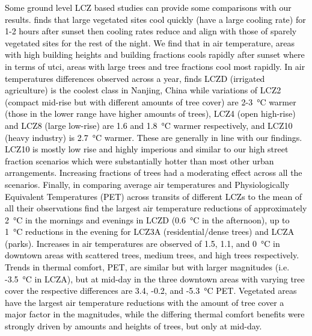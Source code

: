 \documentclass[final,3p,times,authoryear]{elsarticle}
\newcommand{\add}[1]{\textcolor{black}{#1}}
\begin{document}
\add{Some ground level LCZ based studies can provide some comparisons with our results. \cite{Holmer2013} finds that large vegetated sites cool quickly (have a large cooling rate) for 1-2 hours after sunset then cooling rates reduce and align with those of sparely vegetated sites for the rest of the night. We find that in air temperature, areas with high building heights and building fractions cools rapidly after sunset where in terms of \gls{utci}, areas with large trees and tree fractions cool most rapidly. In air temperatures differences observed across a year, \cite{Yang2018} finds LCZD (irrigated agriculture) is the coolest class in Nanjing, China while variations of LCZ2 (compact mid-rise but with different amounts of tree cover) are 2-3\SI{}{\degreeCelsius} warmer (those in the lower range have higher amounts of trees), LCZ4 (open high-rise) and LCZ8 (large low-rise) are 1.6 and 1.8\SI{}{\degreeCelsius} warmer respectively, and LCZ10 (heavy industry) is 2.7\SI{}{\degreeCelsius} warmer. These are generally in line with our findings. LCZ10 is mostly low rise and highly imperious and similar to our high street fraction scenarios which were substantially hotter than most other urban arrangements. Increasing fractions of trees had a moderating effect across all the scenarios. Finally, \cite{Puliafito2013} in comparing average air temperatures and Physiologically Equivalent Temperatures (PET) across transits of different LCZs to the mean of all their observations find the largest air temperature reductions of approximately 2\SI{}{\degreeCelsius} in the mornings and evenings in LCZD (0.6\SI{}{\degreeCelsius} in the afternoon), up to 1\SI{}{\degreeCelsius} reductions in the evening for LCZ3A (residential/dense trees) and LCZA (parks). Increases in air temperatures are observed of 1.5, 1.1, and 0\SI{}{\degreeCelsius} in downtown areas with scattered trees, medium trees, and high trees respectively. Trends in thermal comfort, PET, are similar but with larger magnitudes (i.e. -3.5\SI{}{\degreeCelsius} in LCZA), but at mid-day in the three downtown areas with varying tree cover the respective differences are 3.4, -0.2, and -5.3\SI{}{\degreeCelsius} PET. Vegetated areas have the largest air temperature reductions with the amount of tree cover a major factor in the magnitudes, while the differing thermal comfort benefits were strongly driven by amounts and heights of trees, but only at mid-day.}
\end{document}
